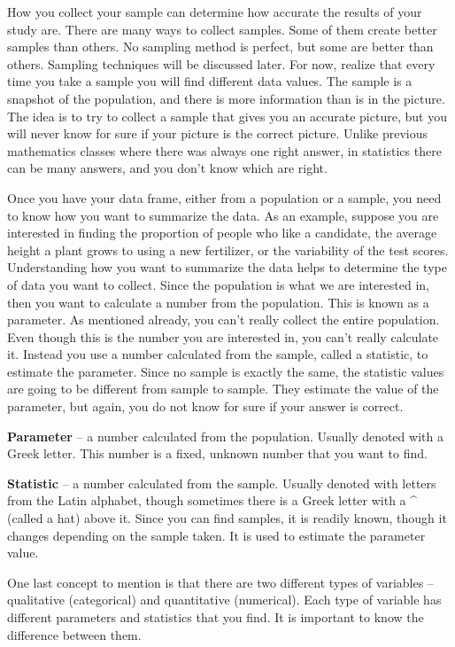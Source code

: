 \documentclass[
]{book}
\begin{document}
How you collect your sample can determine how accurate the results of your study are. There are many ways to collect samples. Some of them create better samples than others. No sampling method is perfect, but some are better than others. Sampling techniques will be discussed later. For now, realize that every time you take a sample you will find different data values. The sample is a snapshot of the population, and there is more information than is in the picture. The idea is to try to collect a sample that gives you an accurate picture, but you will never know for sure if your picture is the correct picture. Unlike previous mathematics classes where there was always one right answer, in statistics there can be many answers, and you don't know which are right.

Once you have your data frame, either from a population or a sample, you need to know how you want to summarize the data. As an example, suppose you are interested in finding the proportion of people who like a candidate, the average height a plant grows to using a new fertilizer, or the variability of the test scores. Understanding how you want to summarize the data helps to determine the type of data you want to collect. Since the population is what we are interested in, then you want to calculate a number from the population. This is known as a parameter. As mentioned already, you can't really collect the entire population. Even though this is the number you are interested in, you can't really calculate it. Instead you use a number calculated from the sample, called a statistic, to estimate the parameter. Since no sample is exactly the same, the statistic values are going to be different from sample to sample. They estimate the value of the parameter, but again, you do not know for sure if your answer is correct.

\textbf{Parameter} -- a number calculated from the population. Usually denoted with a Greek letter. This number is a fixed, unknown number that you want to find.

\textbf{Statistic} -- a number calculated from the sample. Usually denoted with letters from the Latin alphabet, though sometimes there is a Greek letter with a \^{} (called a hat) above it. Since you can find samples, it is readily known, though it changes depending on the sample taken. It is used to estimate the parameter value.

One last concept to mention is that there are two different types of variables -- qualitative (categorical) and quantitative (numerical). Each type of variable has different parameters and statistics that you find. It is important to know the difference between them.
\end{document}
